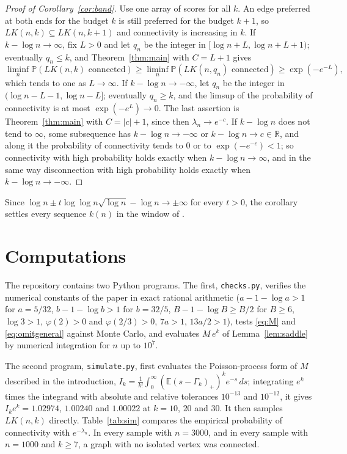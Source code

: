 \documentclass[11pt]{amsart}
\theoremstyle{remark}
\numberwithin{equation}{section}
\newcommand{\E}{\mathbb E}
\newcommand{\Pp}{\mathbb P}
\newcommand{\1}{\mathbf 1}
\begin{document}
\begin{proof}[Proof of Corollary~\ref{cor:band}]
Use one array of scores for all $k$. An edge preferred at both ends for the budget $k$ is still preferred for the budget $k+1$, so $LK(n,k)\subseteq LK(n,k+1)$ and connectivity is increasing in $k$. If $k-\log n\to\infty$, fix $L>0$ and let $q_n$ be the integer in $[\log n+L,\log n+L+1)$; eventually $q_n\le k$, and Theorem~\ref{thm:main} with $C=L+1$ gives
\[
\liminf_n\Pp(LK(n,k)\text{ connected})\ge\liminf_n\Pp(LK(n,q_n)\text{ connected})\ge\exp(-e^{-L}),
\]
which tends to one as $L\to\infty$. If $k-\log n\to-\infty$, let $q_n$ be the integer in $(\log n-L-1,\log n-L]$; eventually $q_n\ge k$, and the limsup of the probability of connectivity is at most $\exp(-e^{L})\to0$. The last assertion is Theorem~\ref{thm:main} with $C=|c|+1$, since then $\lambda_n\to e^{-c}$. If $k-\log n$ does not tend to $\infty$, some subsequence has $k-\log n\to-\infty$ or $k-\log n\to c\in\mathbb R$, and along it the probability of connectivity tends to $0$ or to $\exp(-e^{-c})<1$; so connectivity with high probability holds exactly when $k-\log n\to\infty$, and in the same way disconnection with high probability holds exactly when $k-\log n\to-\infty$.
\end{proof}

Since $\log n\pm t\log\log n\sqrt{\log n}-\log n\to\pm\infty$ for every $t>0$, the corollary settles every sequence $k(n)$ in the window of \cite{DS}.

\section{Computations}\label{sec:numerics}

The repository \cite{code} contains two Python programs. The first, \texttt{checks.py}, verifies the numerical constants of the paper in exact rational arithmetic ($a-1-\log a>1$ for $a=5/32$, $b-1-\log b>1$ for $b=32/5$, $B-1-\log B\ge B/2$ for $B\ge6$, $\log3>1$, $\varphi(2)>0$ and $\varphi(2/3)>0$, $7a>1$, $13a/2>1$), tests \eqref{eq:M} and \eqref{eq:omitgeneral} against Monte Carlo, and evaluates $M\,e^k$ of Lemma~\ref{lem:saddle} by numerical integration for $n$ up to $10^7$.

The second program, \texttt{simulate.py}, first evaluates the Poisson-process form of $M$ described in the introduction, $I_k=\frac1{k!}\int_0^\infty(\E(s-\Gamma_k)_+)^ke^{-s}\,ds$; integrating $e^k$ times the integrand with absolute and relative tolerances $10^{-13}$ and $10^{-12}$, it gives $I_ke^k=1.02974$, $1.00240$ and $1.00022$ at $k=10$, $20$ and $30$. It then samples $LK(n,k)$ directly. Table~\ref{tab:sim} compares the empirical probability of connectivity with $e^{-\lambda_n}$. In every sample with $n=3000$, and in every sample with $n=1000$ and $k\ge7$, a graph with no isolated vertex was connected.
\end{document}

